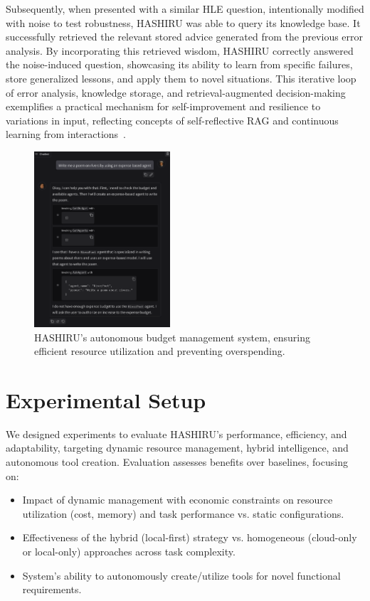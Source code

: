 \documentclass[conference]{IEEEtran}
\begin{document}
Subsequently, when presented with a similar HLE question, intentionally modified with noise to test robustness, HASHIRU was able to query its knowledge base. It successfully retrieved the relevant stored advice generated from the previous error analysis. By incorporating this retrieved wisdom, HASHIRU correctly answered the noise-induced question, showcasing its ability to learn from specific failures, store generalized lessons, and apply them to novel situations. This iterative loop of error analysis, knowledge storage, and retrieval-augmented decision-making exemplifies a practical mechanism for self-improvement and resilience to variations in input, reflecting concepts of self-reflective RAG and continuous learning from interactions~\cite{asai2023self,shinn2023reflexion}.

\begin{figure}[h]
    \centering
    \includegraphics[width=0.45\textwidth]{budget2.png}
    \caption{HASHIRU's autonomous budget management system, ensuring efficient resource utilization and preventing overspending.}
    \label{fig:budget_management}
\end{figure}

\section{Experimental Setup}
\label{sec:experiments}

We designed experiments to evaluate HASHIRU's performance, efficiency, and adaptability, targeting dynamic resource management, hybrid intelligence, and autonomous tool creation. Evaluation assesses benefits over baselines, focusing on:
\begin{itemize}
    \item Impact of dynamic management with economic constraints on resource utilization (cost, memory) and task performance vs. static configurations.
    \item Effectiveness of the hybrid (local-first) strategy vs. homogeneous (cloud-only or local-only) approaches across task complexity.
    \item System's ability to autonomously create/utilize tools for novel functional requirements.
\end{itemize}
\end{document}

